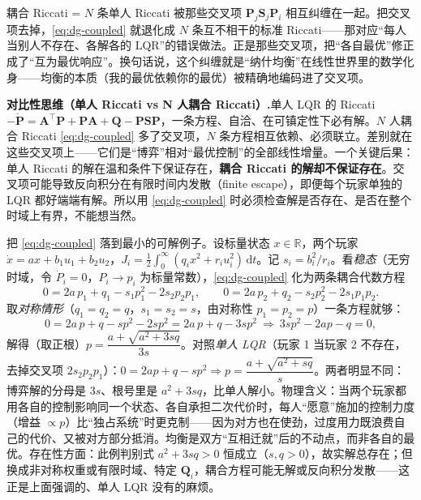 \begin{insight}
耦合 Riccati = $N$ 条单人 Riccati 被那些交叉项 $\mathbf P_j\mathbf S_j\mathbf P_i$ 相互纠缠在一起。把交叉项去掉，\cref{eq:dg-coupled} 就退化成 $N$ 条互不相干的标准 Riccati——那对应“每人当别人不存在、各解各的 LQR”的错误做法。正是那些交叉项，把“各自最优”修正成了“互为最优响应”。换句话说，这个纠缠就是“纳什均衡”在线性世界里的数学化身——均衡的本质（我的最优依赖你的最优）被精确地编码进了交叉项。
\end{insight}

\begin{note}
\textbf{对比性思维（单人 Riccati vs N 人耦合 Riccati）.}\;单人 LQR 的 Riccati $-\dot{\mathbf P}=\mathbf A^\top \mathbf P+\mathbf P\mathbf A+\mathbf Q-\mathbf P\mathbf S\mathbf P$，一条方程、自洽、在可镇定性下必有解。$N$ 人耦合 Riccati \cref{eq:dg-coupled} 多了交叉项，$N$ 条方程相互依赖、必须联立。差别就在这些交叉项上——它们是“博弈”相对“最优控制”的全部线性增量。一个关键后果：单人 Riccati 的解在温和条件下保证存在，\textbf{耦合 Riccati 的解却不保证存在}。交叉项可能导致反向积分在有限时间内发散（finite escape），即便每个玩家单独的 LQR 都好端端有解。所以用 \cref{eq:dg-coupled} 时必须检查解是否存在、是否在整个时域上有界，不能想当然。
\end{note}

\begin{example}
\label{ex:dg-scalar-lq}
把 \cref{eq:dg-coupled} 落到最小的可解例子。设标量状态 $x\in\mathbb{R}$，两个玩家 $\dot x=ax+b_1u_1+b_2u_2$，$J_i=\frac12\int_0^\infty(q_i x^2+r_i u_i^2)\,\mathrm dt$。记 $s_i=b_i^2/r_i$。看\emph{稳态}（无穷时域，令 $\dot P_i=0$，$P_i\to p_i$ 为标量常数），\cref{eq:dg-coupled} 化为两条耦合代数方程
\[
  0=2a\,p_1+q_1-s_1p_1^2-2s_2p_2p_1,\qquad 0=2a\,p_2+q_2-s_2p_2^2-2s_1p_1p_2.
\]
取\emph{对称情形}（$q_1=q_2=q$，$s_1=s_2=s$，由对称性 $p_1=p_2=p$）一条方程就够：
\[
  0=2a\,p+q-sp^2-2sp^2=2a\,p+q-3sp^2\ \Longrightarrow\ 3sp^2-2ap-q=0,
\]
解得（取正根）$p=\dfrac{a+\sqrt{a^2+3sq}}{3s}$。对照\emph{单人 LQR}（玩家 1 当玩家 2 不存在，去掉交叉项 $2s_2p_2p_1$）：$0=2ap+q-sp^2\Rightarrow p=\dfrac{a+\sqrt{a^2+sq}}{s}$。两者明显不同：博弈解的分母是 $3s$、根号里是 $a^2+3sq$，比单人解小。物理含义：当两个玩家都用各自的控制影响同一个状态、各自承担二次代价时，每人“愿意”施加的控制力度（增益 $\propto p$）比“独占系统”时更克制——因为对方也在使劲，过度用力既浪费自己的代价、又被对方部分抵消。均衡是双方“互相迁就”后的不动点，而非各自的最优。存在性方面：此例判别式 $a^2+3sq>0$ 恒成立（$s,q>0$），故实解总存在；但换成非对称权重或有限时域、特定 $\mathbf Q_i$，耦合方程可能无解或反向积分发散——这正是上面强调的、单人 LQR 没有的麻烦。
\end{example}


